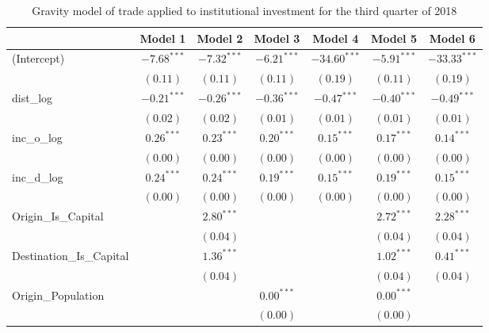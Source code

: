 \begin{table}
	\begin{center}
		\caption[Gravity Model of Trade for Q3 2018]{Gravity model of trade applied to institutional investment for the third quarter of 2018}
		\begin{tabular}{l c c c c c c }
			\hline
			& Model 1 & Model 2 & Model 3 & Model 4 & Model 5 & Model 6 \\
			\hline
			(Intercept)                  & $-7.68^{***}$ & $-7.32^{***}$ & $-6.21^{***}$ & $-34.60^{***}$ & $-5.91^{***}$ & $-33.33^{***}$ \\
			& $(0.11)$      & $(0.11)$      & $(0.11)$      & $(0.19)$       & $(0.11)$      & $(0.19)$       \\
			dist\_log                    & $-0.21^{***}$ & $-0.26^{***}$ & $-0.36^{***}$ & $-0.47^{***}$  & $-0.40^{***}$ & $-0.49^{***}$  \\
			& $(0.02)$      & $(0.02)$      & $(0.01)$      & $(0.01)$       & $(0.01)$      & $(0.01)$       \\
			inc\_o\_log                  & $0.26^{***}$  & $0.23^{***}$  & $0.20^{***}$  & $0.15^{***}$   & $0.17^{***}$  & $0.14^{***}$   \\
			& $(0.00)$      & $(0.00)$      & $(0.00)$      & $(0.00)$       & $(0.00)$      & $(0.00)$       \\
			inc\_d\_log                  & $0.24^{***}$  & $0.24^{***}$  & $0.19^{***}$  & $0.15^{***}$   & $0.19^{***}$  & $0.15^{***}$   \\
			& $(0.00)$      & $(0.00)$      & $(0.00)$      & $(0.00)$       & $(0.00)$      & $(0.00)$       \\
			Origin\_Is\_Capital          &               & $2.80^{***}$  &               &                & $2.72^{***}$  & $2.28^{***}$   \\
			&               & $(0.04)$      &               &                & $(0.04)$      & $(0.04)$       \\
			Destination\_Is\_Capital     &               & $1.36^{***}$  &               &                & $1.02^{***}$  & $0.41^{***}$   \\
			&               & $(0.04)$      &               &                & $(0.04)$      & $(0.04)$       \\
			Origin\_Population           &               &               & $0.00^{***}$  &                & $0.00^{***}$  &                \\
			&               &               & $(0.00)$      &                & $(0.00)$      &                \\

\end{tabular}
\end{center}
\end{table}
